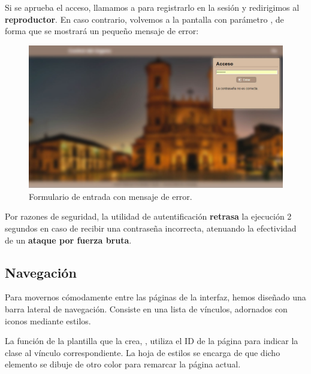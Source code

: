 Si se aprueba el acceso, llamamos a  para registrarlo en la sesión y redirigimos al \textbf{reproductor}. En caso contrario, volvemos a la pantalla con parámetro , de forma que se mostrará un pequeño mensaje de error:

\smallskip

\begin{figure}[H]
	\noindent \begin{centering}
		\includegraphics[width=\linewidth*2/3]{capitulo5/cap_login_error}
		\par\end{centering}
	\smallskip
	\caption{\label{fig:cap_login_error} Formulario de entrada con mensaje de error.}
\end{figure} 

\smallskip

Por razones de seguridad, la utilidad de autentificación \textbf{retrasa} la ejecución 2 segundos en caso de recibir una contraseña incorrecta, atenuando la efectividad de un \textbf{ataque por fuerza bruta}.

\subsection{Navegación}

Para movernos cómodamente entre las páginas de la interfaz, hemos diseñado una barra lateral de navegación. Consiste en una lista de vínculos, adornados con iconos mediante estilos. 

La función de la plantilla que la crea, , utiliza el ID de la página para indicar la clase  al vínculo correspondiente. La hoja de estilos se encarga de que dicho elemento se dibuje de otro color para remarcar la página actual.

